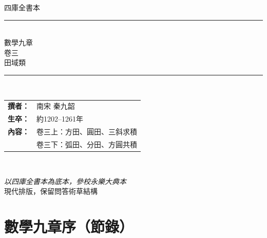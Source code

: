 \documentclass[11pt,a4paper]{article}
\begin{document}
\begin{titlepage}
\centering
\vspace*{2.5cm}

{\fontsize{12}{14}\selectfont\textsc{四庫全書本}}\\[0.5cm]
{\color{rulecolor}\rule{8cm}{0.5pt}}\\[0.8cm]

{\fontsize{26}{32}\selectfont\textcolor{titlecolor}{數學九章}}\\[0.6cm]
{\fontsize{20}{26}\selectfont\textcolor{sectioncolor}{卷三}}\\[0.3cm]
{\fontsize{16}{20}\selectfont\textcolor{subsectioncolor}{田域類}}\\[1cm]

{\color{rulecolor}\rule{8cm}{0.5pt}}\\[0.8cm]

{\large
\begin{tabular}{rl}
\textbf{撰者：} & 南宋 秦九韶 \\[0.4em]
\textbf{生卒：} & 約1202--1261年 \\[0.4em]
\textbf{內容：} & 卷三上：方田、圓田、三斜求積 \\[0.3em]
              & 卷三下：弧田、分田、方圓共積 \\
\end{tabular}
}\\[1.5cm]


\vfill
{\small\textit{以四庫全書本為底本，參校永樂大典本}}\\[0.3cm]
{\small 現代排版，保留問答術草結構}

\end{titlepage}

\tableofcontents
\newpage

\section*{數學九章序（節錄）}
\end{document}
